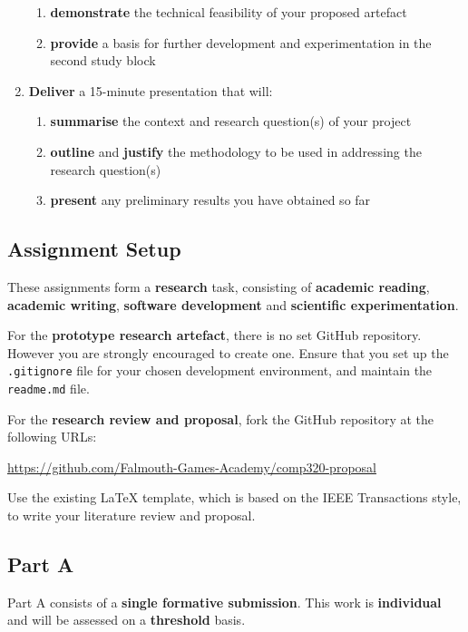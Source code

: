 \documentclass{../fal_assignment}
\begin{document}
\begin{enumerate}[label=(\Alph*)]
\begin{enumerate}[label=(\roman*)]
			\item \textbf{demonstrate} the technical feasibility of your proposed artefact
			\item \textbf{provide} a basis for further development and
				experimentation in the second study block
		\end{enumerate}
	\item \textbf{Deliver} a 15-minute presentation that will:
		\begin{enumerate}[label=(\roman*)]
			\item \textbf{summarise} the context and research question(s)
				of your project
			\item \textbf{outline} and \textbf{justify} the methodology to be used in
				addressing the research question(s)
			\item \textbf{present} any preliminary results you have obtained so far
		\end{enumerate}
\end{enumerate}

\subsection*{Assignment Setup}

These assignments form a \textbf{research} task, consisting of \textbf{academic reading}, \textbf{academic writing},
\textbf{software development} and \textbf{scientific experimentation}.

For the \textbf{prototype research artefact}, there is no set GitHub repository.
However you are strongly encouraged to create one.
Ensure that you set up the \texttt{.gitignore} file for your chosen development environment,
and maintain the \texttt{readme.md} file.

For the \textbf{research review and proposal}, fork the GitHub repository at the following URLs:

\indent \url{https://github.com/Falmouth-Games-Academy/comp320-proposal}

Use the existing LaTeX template, which is based on the IEEE Transactions style,
to write your literature review and proposal.

\subsection*{Part A}

Part A consists of a \textbf{single formative submission}.
This work is \textbf{individual} and will be assessed on a \textbf{threshold} basis.
\end{document}
